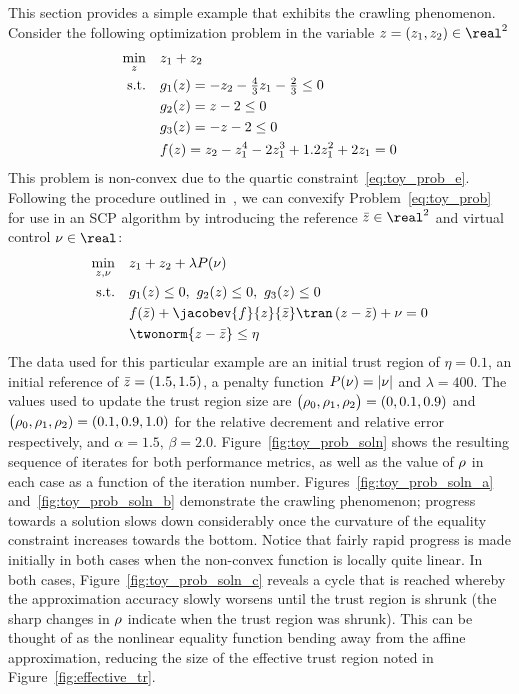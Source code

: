 \documentclass[letterpaper, 10 pt, conference]{ieeeconf}
\begin{document}
This section provides a simple example that exhibits the crawling phenomenon. Consider the following optimization problem in the variable $\z=(z_1,z_2)\in\real^2$
\begin{subequations}\label{eq:toy_prob}
\begin{align}
\min_{z} &\quad z_1+z_2 \label{eq:toy_prob_a}\\
\text{s.t.} &\quad g_1(z) = -z_2 - \tfrac{4}{3} z_1 - \tfrac{2}{3} \leq 0 \label{eq:toy_prob_b}\\
&\quad g_2(z) = z - 2 \leq 0 \label{eq:toy_prob_c}\\
&\quad g_3(z) = -z - 2 \leq 0 \label{eq:toy_prob_d}\\
&\quad f(z) = z_2 - z_1^4 - 2z_1^3 + 1.2z_1^2 + 2z_1 = 0 \label{eq:toy_prob_e}
\end{align}
\end{subequations}
This problem is non-convex due to the quartic constraint~\eqref{eq:toy_prob_e}. Following the procedure outlined in~, we can convexify Problem~\eqref{eq:toy_prob} for use in an SCP algorithm by introducing the reference $\zb\in\real^2$ and virtual control $\vc\in\real$:
\begin{subequations}\label{eq:toy_prob_cvx}
\begin{align}
\min_{\z,\vc} &\quad z_1+z_2 + \lambda P(\vc) \\
\text{s.t.} &\quad \fc_1(\z) \leq 0,~\fc_2(\z)\leq0,~\fc_3(\z)\leq0 \\
&\quad \fne(\zb) + \jacobev{\fne}{z}{\zb}\tran\left( \z - \zb \right) + \vc = 0 \\
&\quad \twonorm{\z - \zb} \leq \eta
\end{align}
\end{subequations}
The data used for this particular example are an initial trust region of $\eta=0.1$, an initial reference of $\bar{z}=(1.5,1.5)$, a penalty function $P(\nu) = | \nu |$ and $\lambda=400$. The values used to update the trust region size are $\big(\rho_0,\rho_1,\rho_2\big)=(0,0.1,0.9)$ and $\big(\rho_0,\rho_1,\rho_2)=(0.1,0.9,1.0)$ for the relative decrement and relative error respectively, and $\alpha=1.5,\,\beta=2.0$. Figure~\ref{fig:toy_prob_soln} shows the resulting sequence of iterates for both performance metrics, as well as the value of $\rho$ in each case as a function of the iteration number. Figures~\ref{fig:toy_prob_soln_a} and~\ref{fig:toy_prob_soln_b} demonstrate the crawling phenomenon; progress towards a solution slows down considerably once the curvature of the equality constraint increases towards the bottom. Notice that fairly rapid progress is made initially in both cases when the non-convex function is locally quite linear. In both cases, Figure~\ref{fig:toy_prob_soln_c} reveals a cycle that is reached whereby the approximation accuracy slowly worsens until the trust region is shrunk (the sharp changes in $\rho$ indicate when the trust region was shrunk). This can be thought of as the nonlinear equality function bending away from the affine approximation, reducing the size of the effective trust region noted in Figure~\ref{fig:effective_tr}. 
\end{document}
